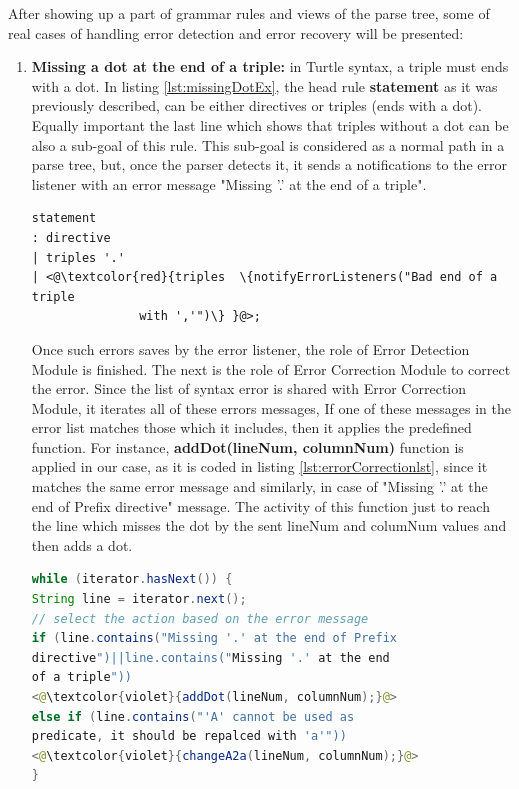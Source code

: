 After showing up a part of grammar rules and views of the parse tree, some of real cases of handling error detection and error recovery will be presented:
\begin{enumerate}
    \item \textbf{Missing a dot at the end of a triple:} in Turtle syntax, a triple must ends with a dot. In listing \ref{lst:missingDotEx}, the head rule \textbf{statement} as it was previously described, can be either directives or triples (ends with a dot). Equally important the last line which shows that triples without a dot can be also a sub-goal of this rule. This sub-goal is considered as a normal path in a parse tree, but, once the parser detects it, it sends a notifications to the error listener with an error message "Missing  ’.’ at the end of a triple".  
    
    
    \begin{lstlisting}[label=lst:missingDotEx,  caption={Detection of a syntax error of a missing dot at the end of a triple in the grammar }] 
statement
: directive
| triples '.'
| <@\textcolor{red}{triples  \{notifyErrorListeners("Bad end of a triple
               with ','")\} }@>;
\end{lstlisting}
Once such errors saves by the error listener, the role of Error Detection Module is finished. The next is the role of Error Correction Module to correct the error. Since the list of syntax error is shared with Error Correction Module, it iterates all of these errors messages, If one of these messages in the error list matches those which it includes, then it applies the predefined function.  For instance, \textbf{addDot(lineNum, columnNum)} function is applied in our case, as it is coded in listing \ref{lst:errorCorrectionlst}, since it matches the same error message and similarly, in case of "Missing  ’.’ at the  end of  Prefix directive" message. The activity of this function just to reach the line which misses the dot by the sent lineNum and columNum values and then adds a dot. 
    \begin{lstlisting}[language=java, label=lst:errorCorrectionlst,  caption={Java-based handling of error correction based on the error message in Error Correction Module }] 
while (iterator.hasNext()) {
String line = iterator.next();
// select the action based on the error message
if (line.contains("Missing '.' at the end of Prefix
directive")||line.contains("Missing '.' at the end 
of a triple"))
<@\textcolor{violet}{addDot(lineNum, columnNum);}@>
else if (line.contains("'A' cannot be used as
predicate, it should be repalced with 'a'"))
<@\textcolor{violet}{changeA2a(lineNum, columnNum);}@>
}
\end{lstlisting}


\end{enumerate}
